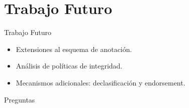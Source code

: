  \section{Trabajo Futuro}
	
\begin{frame}{Trabajo Futuro}
	\begin{block}{}
	\begin{itemize}
	  \item Extensiones al esquema de anotación.
	  \item Análisis de políticas de integridad.
	  \item Mecanismos adicionales: declasificación y endorsement.
	\end{itemize}
	\end{block}
\end{frame}

\begin{frame}{Preguntas}

\end{frame}